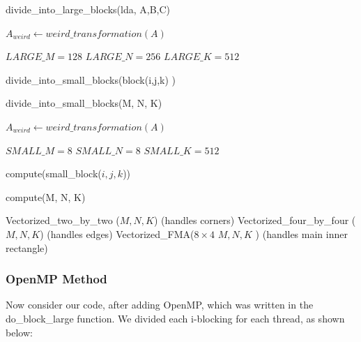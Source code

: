 \documentclass[12pt]{article}
\begin{document}
\begin{algorithm}
\caption{divide\_into\_large\_blocks(lda, A,B,C)}
\begin{algorithmic} 
\STATE $A_{weird} \leftarrow weird\_transformation(A)$

\STATE $LARGE\_M = 128$
\STATE $LARGE\_N = 256$
\STATE $LARGE\_K = 512$




\STATE divide\_into\_small\_blocks(block(i,j,k) )

\ENDFOR
\ENDFOR
\ENDFOR
\end{algorithmic}
\end{algorithm}

\begin{algorithm}
\caption{divide\_into\_small\_blocks(M, N, K)}
\begin{algorithmic} 
\STATE $A_{weird} \leftarrow weird\_transformation(A)$

\STATE $SMALL\_M = 8$
\STATE $SMALL\_N = 8$
\STATE $SMALL\_K = 512$


\STATE compute(small\_block($i,j,k$))

\ENDFOR
\ENDFOR
\ENDFOR
\end{algorithmic}
\end{algorithm}

\begin{algorithm}
\caption{compute(M, N, K)}
\begin{algorithmic} 


\STATE Vectorized\_two\_by\_two ($M,N,K$) (handles corners)
\STATE Vectorized\_four\_by\_four ($M,N,K$) (handles edges)
\STATE Vectorized\_FMA($8 \times 4$ $M,N,K$ ) (handles main inner rectangle)

\end{algorithmic}
\end{algorithm}
\newpage 
\subsubsection{OpenMP Method}
Now consider our code, after adding OpenMP, which was written in the do\_block\_large function. We divided each i-blocking for each thread, as shown below: 
\end{document}
